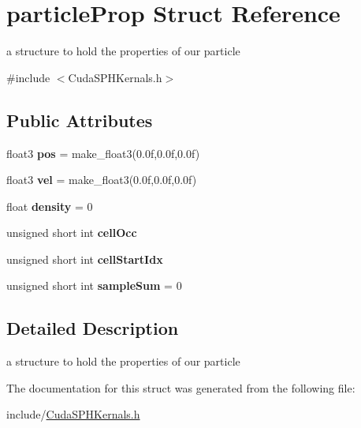 \hypertarget{structparticle_prop}{\section{particle\-Prop Struct Reference}
\label{structparticle_prop}
}


a structure to hold the properties of our particle  




{\ttfamily \#include $<$Cuda\-S\-P\-H\-Kernals.\-h$>$}

\subsection*{Public Attributes}
\begin{DoxyCompactItemize}
\item 
\hypertarget{structparticle_prop_a05f3d0c824b9eeae21c00f72ea414099}{float3 {\bfseries pos} = make\-\_\-float3(0.\-0f,0.\-0f,0.\-0f)}\label{structparticle_prop_a05f3d0c824b9eeae21c00f72ea414099}

\item 
\hypertarget{structparticle_prop_aa762b3243befb09ff17ccc4962af8dea}{float3 {\bfseries vel} = make\-\_\-float3(0.\-0f,0.\-0f,0.\-0f)}\label{structparticle_prop_aa762b3243befb09ff17ccc4962af8dea}

\item 
\hypertarget{structparticle_prop_ac94355e032cf4dfc6fc432719ece340b}{float {\bfseries density} = 0}\label{structparticle_prop_ac94355e032cf4dfc6fc432719ece340b}

\item 
\hypertarget{structparticle_prop_a2d6be4f01b34250e2ba0fffb4c118216}{unsigned short int {\bfseries cell\-Occ}}\label{structparticle_prop_a2d6be4f01b34250e2ba0fffb4c118216}

\item 
\hypertarget{structparticle_prop_a88168adfb6356607bf4f6336bc6404f7}{unsigned short int {\bfseries cell\-Start\-Idx}}\label{structparticle_prop_a88168adfb6356607bf4f6336bc6404f7}

\item 
\hypertarget{structparticle_prop_abf226fa15e2e4a9327f30ac6ce755273}{unsigned short int {\bfseries sample\-Sum} = 0}\label{structparticle_prop_abf226fa15e2e4a9327f30ac6ce755273}

\end{DoxyCompactItemize}


\subsection{Detailed Description}
a structure to hold the properties of our particle 

The documentation for this struct was generated from the following file\-:\begin{DoxyCompactItemize}
\item 
include/\hyperlink{_cuda_s_p_h_kernals_8h}{Cuda\-S\-P\-H\-Kernals.\-h}\end{DoxyCompactItemize}
